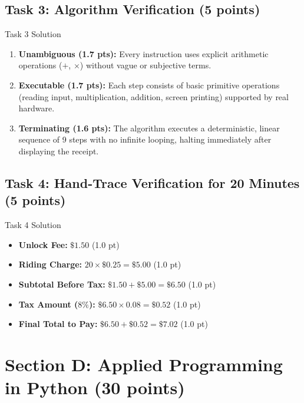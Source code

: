 \documentclass[11pt,a4paper]{article}
\begin{document}
\subsection*{Task 3: Algorithm Verification (5 points)}
\begin{solbox}{Task 3 Solution}
\begin{enumerate}[label=\alph*., noitemsep]
  \item \textbf{Unambiguous (1.7 pts):} Every instruction uses explicit arithmetic operations ($+$, $\times$) without vague or subjective terms.
  \item \textbf{Executable (1.7 pts):} Each step consists of basic primitive operations (reading input, multiplication, addition, screen printing) supported by real hardware.
  \item \textbf{Terminating (1.6 pts):} The algorithm executes a deterministic, linear sequence of 9 steps with no infinite looping, halting immediately after displaying the receipt.
\end{enumerate}
\end{solbox}

\subsection*{Task 4: Hand-Trace Verification for 20 Minutes (5 points)}
\begin{solbox}{Task 4 Solution}
\begin{itemize}[noitemsep]
  \item \textbf{Unlock Fee:} $\$1.50$ (1.0 pt)
  \item \textbf{Riding Charge:} $20 \times \$0.25 = \$5.00$ (1.0 pt)
  \item \textbf{Subtotal Before Tax:} $\$1.50 + \$5.00 = \$6.50$ (1.0 pt)
  \item \textbf{Tax Amount ($8\%$):} $\$6.50 \times 0.08 = \$0.52$ (1.0 pt)
  \item \textbf{Final Total to Pay:} $\$6.50 + \$0.52 = \$7.02$ (1.0 pt)
\end{itemize}
\end{solbox}

\newpage

\section*{Section D: Applied Programming in Python (30 points)}
\end{document}
